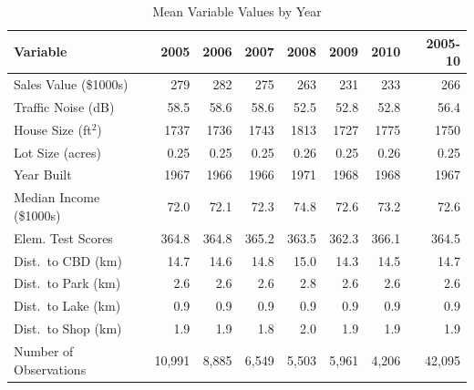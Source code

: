 \documentclass{article}\usepackage{graphicx, color}
\begin{document}
\begin{table}
\begin{center}
\caption{Mean Variable Values by Year}\label{tab:SumStatsTime}
\small
    \begin{tabular}{lrrrrrr|r}
    Variable & 2005 & 2006 & 2007 & 2008 & 2009 & 2010 & 2005-10\\ \hline
    Sales Value (\$1000s) & 279   & 282   & 275   & 263   & 231   & 233   & 266 \\
    Traffic Noise (dB) & 58.5  & 58.6  & 58.6  & 52.5  & 52.8  & 52.8  & 56.4 \\
    House Size (ft$^2$) & 1737  & 1736  & 1743  & 1813  & 1727  & 1775  & 1750 \\
    Lot Size (acres) & 0.25  & 0.25  & 0.25  & 0.26  & 0.25  & 0.26  & 0.25 \\
    Year Built  & 1967  & 1966  & 1966  & 1971  & 1968  & 1968  & 1967 \\
    Median Income (\$1000s) & 72.0  & 72.1  & 72.3  & 74.8  & 72.6  & 73.2  & 72.6 \\
    Elem. Test Scores & 364.8 & 364.8 & 365.2 & 363.5 & 362.3 & 366.1 & 364.5 \\
    Dist.\ to CBD (km) & 14.7  & 14.6  & 14.8  & 15.0  & 14.3  & 14.5  & 14.7 \\
    Dist.\ to Park (km) & 2.6   & 2.6   & 2.6   & 2.8   & 2.6   & 2.6   & 2.6 \\
    Dist.\ to Lake (km) & 0.9   & 0.9   & 0.9   & 0.9   & 0.9   & 0.9   & 0.9 \\
    Dist.\ to Shop (km) & 1.9   & 1.9   & 1.8   & 2.0   & 1.9   & 1.9   & 1.9 \\ \hline
    Number of Observations &  10,991  & 8,885  &  6,549  & 5,503  &  5,961  & 4,206  & 42,095  \\
    \end{tabular}%
\end{center}
\end{table}
\end{document}
